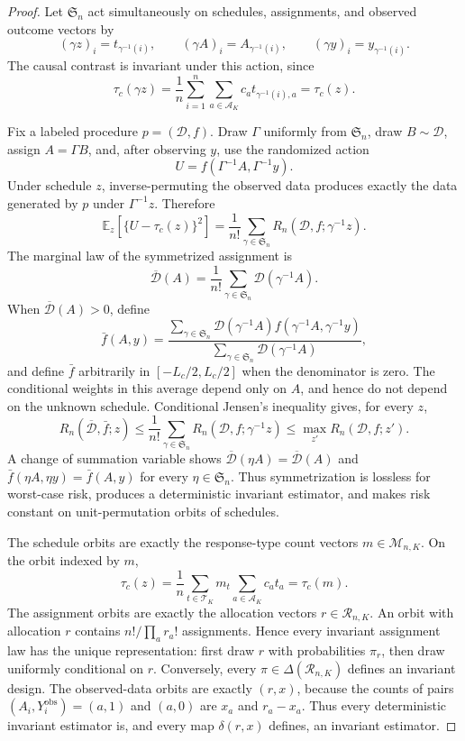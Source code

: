 \documentclass{article}
\begin{document}
\begin{proof}
Let \(\mathfrak S_n\) act simultaneously on schedules, assignments, and observed outcome vectors by
\[
 (\gamma z)_i=t_{\gamma^{-1}(i)},\qquad
 (\gamma A)_i=A_{\gamma^{-1}(i)},\qquad
 (\gamma y)_i=y_{\gamma^{-1}(i)}.
\]
The causal contrast is invariant under this action, since
\[
 \tau_c(\gamma z)
 =\frac1n\sum_{i=1}^n\sum_{a\in\mathcal A_K}c_at_{\gamma^{-1}(i),a}
 =\tau_c(z).
\]

Fix a labeled procedure \(p=(\mathcal D,f)\).  Draw \(\Gamma\) uniformly from \(\mathfrak S_n\), draw \(B\sim\mathcal D\), assign \(A=\Gamma B\), and, after observing \(y\), use the randomized action
\[
 U=f(\Gamma^{-1}A,\Gamma^{-1}y).
\]
Under schedule \(z\), inverse-permuting the observed data produces exactly the data generated by \(p\) under \(\Gamma^{-1}z\).  Therefore
\[
 \mathbb E_z\!\left[\{U-\tau_c(z)\}^2\right]
 =\frac1{n!}\sum_{\gamma\in\mathfrak S_n}
 R_n(\mathcal D,f;\gamma^{-1}z).
\]
The marginal law of the symmetrized assignment is
\[
 \overline{\mathcal D}(A)
 =\frac1{n!}\sum_{\gamma\in\mathfrak S_n}\mathcal D(\gamma^{-1}A).
\]
When \(\overline{\mathcal D}(A)>0\), define
\[
 \bar f(A,y)=
 \frac{\sum_{\gamma\in\mathfrak S_n}\mathcal D(\gamma^{-1}A)
 f(\gamma^{-1}A,\gamma^{-1}y)}
 {\sum_{\gamma\in\mathfrak S_n}\mathcal D(\gamma^{-1}A)},
\]
and define \(\bar f\) arbitrarily in \([-L_c/2,L_c/2]\) when the denominator is zero.  The conditional weights in this average depend only on \(A\), and hence do not depend on the unknown schedule.  Conditional Jensen's inequality gives, for every \(z\),
\[
 R_n(\overline{\mathcal D},\bar f;z)
 \le \frac1{n!}\sum_{\gamma\in\mathfrak S_n}
 R_n(\mathcal D,f;\gamma^{-1}z)
 \le \max_{z'}R_n(\mathcal D,f;z').
\]
A change of summation variable shows
\(\overline{\mathcal D}(\eta A)=\overline{\mathcal D}(A)\) and
\(\bar f(\eta A,\eta y)=\bar f(A,y)\) for every \(\eta\in\mathfrak S_n\).  Thus symmetrization is lossless for worst-case risk, produces a deterministic invariant estimator, and makes risk constant on unit-permutation orbits of schedules.

The schedule orbits are exactly the response-type count vectors \(m\in\mathcal M_{n,K}\).  On the orbit indexed by \(m\),
\[
 \tau_c(z)=\frac1n\sum_{t\in\mathcal T_K}m_t
 \sum_{a\in\mathcal A_K}c_at_a=\tau_c(m).
\]
The assignment orbits are exactly the allocation vectors \(r\in\mathcal R_{n,K}\).  An orbit with allocation \(r\) contains \(n!/\prod_a r_a!\) assignments.  Hence every invariant assignment law has the unique representation: first draw \(r\) with probabilities \(\pi_r\), then draw uniformly conditional on \(r\).  Conversely, every \(\pi\in\Delta(\mathcal R_{n,K})\) defines an invariant design.  The observed-data orbits are exactly \((r,x)\), because the counts of pairs \((A_i,Y_i^{\mathrm{obs}})=(a,1)\) and \((a,0)\) are \(x_a\) and \(r_a-x_a\).  Thus every deterministic invariant estimator is, and every map \(\delta(r,x)\) defines, an invariant estimator.


\end{proof}
\end{document}
